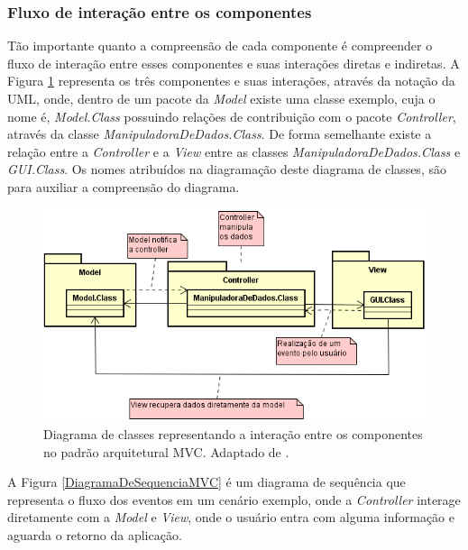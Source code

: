 \subsubsection{Fluxo de interação entre os componentes}

Tão importante quanto a compreensão de cada componente é compreender o fluxo de interação entre esses componentes e suas interações diretas e indiretas. A Figura \ref{DiagramaDeClasseMVC} representa os três componentes e suas interações, através da notação da UML, onde, dentro de um pacote da \textit{Model} existe uma classe exemplo, cuja o nome é, \textit{Model.Class} possuindo relações de contribuição com o pacote \textit{Controller}, através da classe \textit{ManipuladoraDeDados.Class}. De forma semelhante existe a relação entre a \textit{Controller} e a \textit{View} entre as classes  \textit{ManipuladoraDeDados.Class} e \textit{GUI.Class}. Os nomes atribuídos na diagramação deste diagrama de classes, são para auxiliar a compreensão do diagrama. 

\begin{figure}[h!]
	\centering
	\includegraphics[keepaspectratio=true,scale=0.9]{figuras/DiagramaDeClasseMVC.PNG}
	\caption{Diagrama de classes representando a interação entre os componentes no padrão arquitetural MVC. Adaptado de \cite{durelli2008proposta}.}
	\label{DiagramaDeClasseMVC}
\end{figure}

\pagebreak

A Figura \ref{DiagramaDeSequenciaMVC} é um diagrama de sequência que representa o fluxo dos eventos em um cenário exemplo, onde a \textit{Controller} interage diretamente com a \textit{Model} e \textit{View}, onde o usuário entra com alguma informação e aguarda o retorno da aplicação. 


